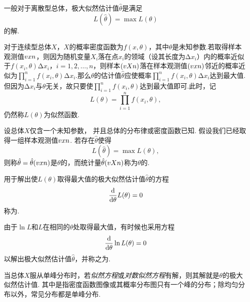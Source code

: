 一般对于离散型总体，极大似然估计值\(\hat{\theta}\)是满足\[
L(\hat{\theta}) = \max L(\theta)
\]的解.

对于连续型总体\(X\)，\(X\)的概率密度函数为\(f(x,\theta)\)，其中\(\theta\)是未知参数.若取得样本观测值\(v{x}{n}\)，则因为随机变量\(X_i\)落在点\(x_i\)的领域（设其长度为\(\increment x_i\)）内的概率近似于\(f(x_i,\theta) \increment x_i\)，\(i=1,2,\dotsc,n\)，则样本\((v{X}{n})\)落在样本观测值\((v{x}{n})\)邻近的概率近似为\(\prod\limits_{i=1}^n{f(x_i,\theta) \increment x_i}\).那么\(\theta\)的估计值\(\hat{\theta}\)应使概率\(\prod\limits_{i=1}^n{f(x_i,\theta) \increment x_i}\)达到最大值.但因为\(\increment x_i\)与\(\theta\)无关，故只要使\(\prod\limits_{i=1}^n{f(x_i,\theta)}\)达到最大值即可.此时，记\[
L(\theta) = \prod\limits_{i=1}^n{f(x_i,\theta)},
\]仍然称\(L(\theta)\)为似然函数.

\begin{definition}
设总体\(X\)仅含一个未知参数，%
并且总体的分布律或密度函数已知.
假设我们已经取得一组样本观测值\(v{x}{n}\).
若存在\(\hat{\theta}\)使得\[
L(\hat{\theta}) = \max L(\theta),
\]则称\(\hat{\theta} = \hat{\theta}(v{x}{n})\)是\(\theta\)的，而统计量\(\hat{\theta}(v{X}{n})\)称为\(\theta\)的.
\end{definition}

\begin{definition}
用于解出使\(L(\theta)\)取得最大值的极大似然估计值\(\hat{\theta}\)的方程\[
\dv{\theta} L(\theta) = 0
\]称为.

由于\(\ln L\)和\(L\)在相同的\(\theta\)处取得最大值，有时候也采用方程\[
\dv{\theta} \ln L(\theta) = 0
\]以解出极大似然估计值\(\hat{\theta}\)，并称之为.
\end{definition}

\begin{theorem}
当总体\(X\)服从单峰分布时，若\emph{似然方程}或\emph{对数似然方程}有解，则其解就是\(\theta\)的极大似然估计值.
其中是指密度函数图像或其概率分布图只有一个峰的分布；除均匀分布以外，常见分布都是单峰分布.
\end{theorem}

